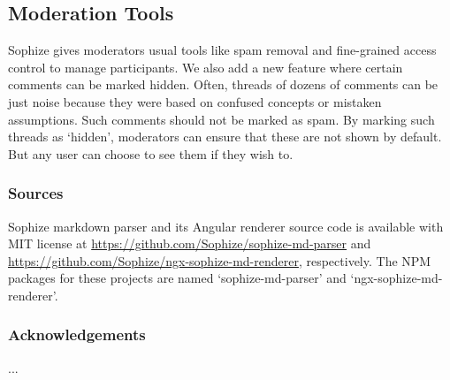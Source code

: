 \documentclass[a4paper]{article}
\begin{document}
\subsection{Moderation Tools}

Sophize gives moderators usual tools like spam removal and fine-grained access control to manage participants. We also add a new feature where certain comments can be marked hidden. Often, threads of dozens of comments can be just noise because they were based on confused concepts or mistaken assumptions. Such comments should not be marked as spam. By marking such threads as `hidden', moderators can ensure that these are not shown by default. But any user can choose to see them if they wish to.

\subsubsection*{Sources}
Sophize markdown parser and its Angular renderer source code is available with MIT license at \url{https://github.com/Sophize/sophize-md-parser} and \url{https://github.com/Sophize/ngx-sophize-md-renderer}, respectively. The NPM packages for these projects are named `sophize-md-parser' and `ngx-sophize-md-renderer'.

\subsubsection*{Acknowledgements}

...


 








\end{document}
